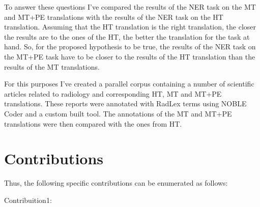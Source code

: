 To answer these questions I've compared the results of the NER task on the MT and MT+PE translations with the results of the NER task on the HT translation. Assuming that the HT translation is the right translation, the closer the results are to the ones of the HT, the better the translation for the task at hand. So, for the proposed hypothesis to be true, the results of the NER task on the MT+PE task have to be closer to the results of the HT translation than the results of the MT translations.

For this purposes I've created a parallel corpus containing a number of scientific articles related to radiology and corresponding HT, MT and MT+PE translations. These reports were annotated with RadLex terms using NOBLE Coder and a custom built tool. The annotations of the MT and MT+PE translations were then compared with the ones from HT.


\section{Contributions}


Thus, the following specific contributions can be enumerated as follows:
\begin{description}
	\item[Contribuition1:] 
\end{description}


